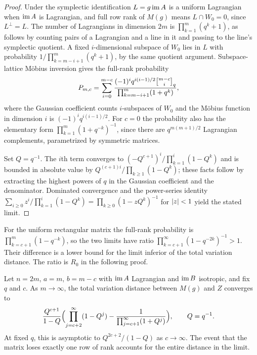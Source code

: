 \begin{proof}
Under the symplectic identification $L=g\operatorname{im} A$ is a uniform Lagrangian when
$\operatorname{im} A$ is Lagrangian, and full row rank of $M(g)$ means $L\cap W_0=0$,
since $L^\perp=L$. The number of Lagrangians in dimension $2m$ is $\prod_{k=1}^m(q^k+1)$, as
follows by counting pairs of a Lagrangian and a line in it and passing to the
line's symplectic quotient. A fixed $i$-dimensional subspace of $W_0$ lies in
$L$ with probability $1/\prod_{k=m-i+1}^{m}(q^k+1)$, by the same quotient
argument. Subspace-lattice M\"obius inversion gives the full-rank probability
\begin{equation}\label{spn:eq:Pmc}
 P_{m,c}=\sum_{i=0}^{m-c}
 \frac{(-1)^iq^{i(i-1)/2}\spnqbin{m-c}{i}{q}}{\prod_{k=m-i+1}^{m}(1+q^k)},
\end{equation}
where the Gaussian coefficient counts $i$-subspaces of $W_0$ and the M\"obius
function in dimension $i$ is $(-1)^iq^{i(i-1)/2}$. For $c=0$ the probability
also has the elementary form $\prod_{k=1}^m(1+q^{-k})^{-1}$, since there are
$q^{m(m+1)/2}$ Lagrangian complements, parametrized by symmetric matrices.

Set $Q=q^{-1}$. The $i$th term converges to
$(-Q^{c+1})^i/\prod_{k=1}^i(1-Q^k)$ and is bounded in absolute value by
$Q^{(c+1)i}/\prod_{k\ge1}(1-Q^k)$; these facts follow by extracting the
highest powers of $q$ in the Gaussian coefficient and the denominator.
Dominated convergence and the power-series identity
$\sum_{i\ge0}z^i/\prod_{k=1}^i(1-Q^k)=\prod_{k\ge0}(1-zQ^k)^{-1}$ for
$\lvert z\rvert<1$ yield
the stated limit.
\end{proof}

For the uniform rectangular matrix the full-rank probability is
$\prod_{k=c+1}^{m}(1-q^{-k})$, so the two limits have ratio
$\prod_{k=c+1}^\infty(1-q^{-2k})^{-1}>1$. Their difference is a lower bound
for the limit inferior of the total variation distance. The ratio is $R_0$ in
the following proof.

\begin{theorem}\label{spn:thm:symplectic-exact}
Let $n=2m$, $a=m$, $b=m-c$ with $\operatorname{im} A$ Lagrangian and $\operatorname{im} B$
isotropic, and fix $q$ and $c$. As $m\to\infty$, the total variation distance
between $M(g)$ and $Z$ converges to
\begin{equation}\label{spn:eq:symplectic-limit}
 \frac{Q^{c+1}}{1-Q}\Bigl(\prod_{j=c+2}^{\infty}(1-Q^j)
 -\frac{1}{\prod_{j=c+1}^{\infty}(1+Q^j)}\Bigr),\qquad Q=q^{-1}.
\end{equation}
At fixed $q$, this is asymptotic to $Q^{2c+2}/(1-Q)$ as $c\to\infty$. The
event that the matrix loses exactly one row of rank accounts for the entire
distance in the limit.
\end{theorem}

